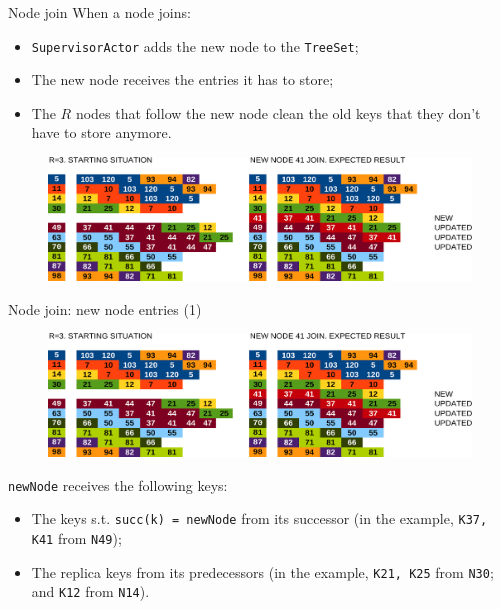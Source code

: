 \documentclass{beamer}
\begin{document}
\begin{frame}{Node join} \justify
    When a node joins:

    \begin{itemize}[label=$\bullet$]
        \item \texttt{SupervisorActor} adds the new node to the \texttt{TreeSet};
        \item The new node receives the entries it has to store;
        \item The $R$ nodes that follow the new node clean the old keys that they don't have to store anymore. 
    \end{itemize}

    \begin{figure}
        \includegraphics[width=\linewidth]{01-NodeJoin.png}
    \end{figure}
\end{frame}

\begin{frame}{Node join: new node entries (1)} \justify

    \begin{figure}
        \includegraphics[width=\linewidth]{01-NodeJoin.png}
    \end{figure}

    \texttt{newNode} receives the following keys:

    \begin{itemize}[label=$\bullet$]
        \item The keys s.t. \texttt{succ(k) = newNode} from its successor (in the example, \texttt{K37, K41} from \texttt{N49});
        
        \item The replica keys from its predecessors (in the example, \texttt{K21, K25} from \texttt{N30}; and \texttt{K12} from \texttt{N14}).
    \end{itemize}

\end{frame}
\end{document}
